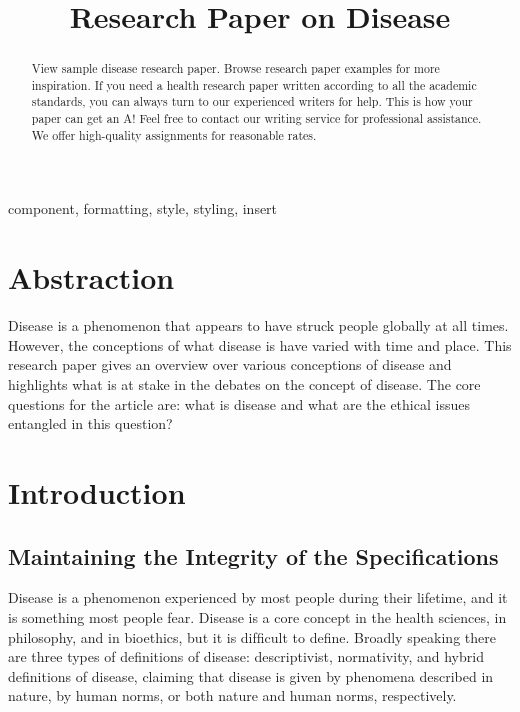 \documentclass[conference]{IEEEtran}
\begin{document}
\title{Research Paper on Disease\\
}


\maketitle

\begin{abstract}
View sample disease research paper. Browse research paper examples for more inspiration. If you need a health research paper written according to all the academic standards, you can always turn to our experienced writers for help. This is how your paper can get an A! Feel free to contact our writing service for professional assistance. We offer high-quality assignments for reasonable rates.
\end{abstract}

\begin{IEEEkeywords}
component, formatting, style, styling, insert
\end{IEEEkeywords}

\section{Abstraction}
Disease is a phenomenon that appears to have struck people globally at all times. However, the conceptions of what disease is have varied with time and place. This research paper gives an overview over various conceptions of disease and highlights what is at stake in the debates on the concept of disease. The core questions for the article are: what is disease and what are the ethical issues entangled in this question?

\section{Introduction}

\subsection{Maintaining the Integrity of the Specifications}

Disease is a phenomenon experienced by most people during their lifetime, and it is something most people fear. Disease is a core concept in the health sciences, in philosophy, and in bioethics, but it is difﬁcult to deﬁne. Broadly speaking there are three types of deﬁnitions of disease: descriptivist, normativity, and hybrid deﬁnitions of disease, claiming that disease is given by phenomena described in nature, by human norms, or both nature and human norms, respectively.
\end{document}
